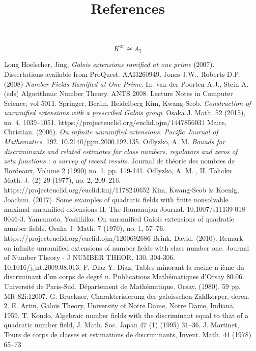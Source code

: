 \documentclass[preprint,12pt,reqno]{elsarticle}
\begin{document}
\begin{equation}
    K^{ur}\cong A_{5}
\end{equation}
\begin{thebibliography}{9}
\title{References}
Long Hoelscher, Jing, \textit{Galois extensions ramified at one prime} (2007). Dissertations available from ProQuest. AAI3260949. 
Jones J.W., Roberts D.P. (2008) \textit{Number Fields Ramified at One Prime}. In: van der Poorten A.J., Stein A. (eds) Algorithmic Number Theory. ANTS 2008. Lecture Notes in Computer Science, vol 5011. Springer, Berlin, Heidelberg
Kim, Kwang-Seob. \textit{Construction of unramified extensions with a prescribed Galois group}. Osaka J. Math. 52 (2015), no. 4, 1039--1051. https://projecteuclid.org/euclid.ojm/1447856031
Maire, Christian. (2006). \textit{On infinite unramified extensions. Pacific Journal of Mathematics}. 192. 10.2140/pjm.2000.192.135. 
Odlyzko, A. M. \textit{Bounds for discriminants and related estimates for class numbers, regulators and zeros of zeta functions : a survey of recent results}. Journal de théorie des nombres de Bordeaux, Volume 2 (1990) no. 1, pp. 119-141. 
Odlyzko, A. M. , II. Tohoku Math. J. (2) 29 (1977), no. 2, 209--216.  https://projecteuclid.org/euclid.tmj/1178240652
Kim, Kwang-Seob & Koenig, Joachim. (2017). Some examples of quadratic fields with finite nonsolvable maximal unramified extensions II. The Ramanujan Journal. 10.1007/s11139-018-0046-3. 
Yamamoto, Yoshihiko. On unramified Galois extensions of quadratic number fields. Osaka J. Math. 7 (1970), no. 1, 57--76. https://projecteuclid.org/euclid.ojm/1200692686
Brink, David. (2010). Remark on infinite unramified extensions of number fields with class number one. Journal of Number Theory - J NUMBER THEOR. 130. 304-306. 10.1016/j.jnt.2009.08.013. 
 F. Diaz Y. Diaz, Tables minorant la racine n-ième du discriminant d'un corps de degré n. Publications Mathématiques d'Orsay 80.06. Université de Paris-Sud, Département de Mathématique, Orsay, (1980). 59 pp. MR 82i:12007.
 G. Bruckner, Charakterisierung der galoisschen Zahlkorper, deren. 2. E. Artin, Galois Theory, University of Notre Dame, Notre Dame, Indiana, 1959.
 T. Kondo, Algebraic number fields with the discriminant equal to that of a quadratic number field, J. Math. Soc. Japan 47 (1)
(1995) 31–36.
 J. Martinet, Tours de corps de classes et estimations de discriminants, Invent. Math. 44 (1978) 65–73

\end{thebibliography}
\end{document}
